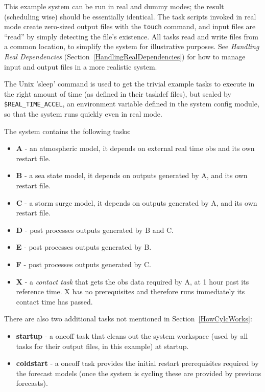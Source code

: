 

This example system can be run in real and dummy modes; the result
(scheduling wise) should be essentially identical. The task scripts
invoked in real mode create zero-sized output files with the
\lstinline=touch= command, and input files are ``read'' by simply
detecting the file's existence.  All tasks read and write files from a
common location, to simplify the system for illustrative purposes. See
{\em Handling Real Dependencies}
(Section~\ref{HandlingRealDependencies}) for how to manage input and
output files in a more realistic system. 

The Unix 'sleep' command is used to get the trivial example tasks to
execute in the right amount of time (as defined in their taskdef files),
but scaled by \lstinline=$REAL_TIME_ACCEL=, an environment variable
defined in the system config module, so that the system runs quickly 
even in real mode.

The system contains the following tasks:

\begin{itemize}
    \item {\bf A} - an atmospheric model, it depends on external real
        time obs and its own restart file.
    \item {\bf B} - a sea state model, it depends on outputs generated
        by A, and its own restart file.
    \item {\bf C} - a storm surge model, it depends on outputs generated
        by A, and its own restart file.
    \item {\bf D} - post processes outputs generated by B and C.
    \item {\bf E} - post processes outputs generated by B.
    \item {\bf F} - post processes outputs generated by C.
    \item {\bf X} - a {\em contact task} that gets the obs data required
    by A, at 1 hour past its reference time. X has no prerequisites and
    therefore runs immediately its contact time has passed.
\end{itemize}

There are also two additional tasks not mentioned in Section~\ref{HowCylcWorks}:

\begin{itemize}
    \item {\bf startup} - a oneoff task that cleans out the system
    workspace (used by all tasks for their output files, in this
    example) at startup.
    \item {\bf coldstart} - a oneoff task provides the initial restart
    prerequisites required by the forecast models (once the system
    is cycling these are provided by previous forecasts). 
\end{itemize}


